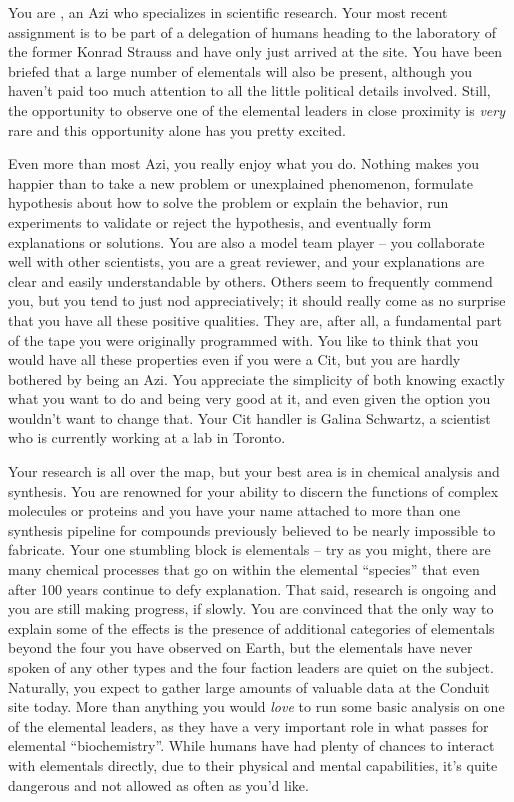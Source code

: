 \documentclass[char]{elementals}
\begin{document}
\name{\cScientist{}}

You are \cScientist{\intro}, an Azi who specializes in scientific research. Your most recent assignment is to be part of a delegation of humans heading to the laboratory of the former Konrad Strauss and have only just arrived at the site. You have been briefed that a large number of elementals will also be present, although you haven't paid too much attention to all the little political details involved. Still, the opportunity to observe one of the elemental leaders in close proximity is \emph{very} rare and this opportunity alone has you pretty excited.

Even more than most Azi, you really enjoy what you do. Nothing makes you happier than to take a new problem or unexplained phenomenon, formulate hypothesis about how to solve the problem or explain the behavior, run experiments to validate or reject the hypothesis, and eventually form explanations or solutions. You are also a model team player -- you collaborate well with other scientists, you are a great reviewer, and your explanations are clear and easily understandable by others. Others seem to frequently commend you, but you tend to just nod appreciatively; it should really come as no surprise that you have all these positive qualities. They are, after all, a fundamental part of the tape you were originally programmed with. You like to think that you would have all these properties even if you were a Cit, but you are hardly bothered by being an Azi. You appreciate the simplicity of both knowing exactly what you want to do and being very good at it, and even given the option you wouldn't want to change that. Your Cit handler is Galina Schwartz, a scientist who is currently working at a lab in Toronto.

Your research is all over the map, but your best area is in chemical analysis and synthesis. You are renowned for your ability to discern the functions of complex molecules or proteins and you have your name attached to more than one synthesis pipeline for compounds previously believed to be nearly impossible to fabricate. Your one stumbling block is elementals -- try as you might, there are many chemical processes that go on within the elemental ``species'' that even after 100 years continue to defy explanation. That said, research is ongoing and you are still making progress, if slowly. You are convinced that the only way to explain some of the effects is the presence of additional categories of elementals beyond the four you have observed on Earth, but the elementals have never spoken of any other types and the four faction leaders are quiet on the subject. Naturally, you expect to gather large amounts of valuable data at the Conduit site today. More than anything you would \emph{love} to run some basic analysis on one of the elemental leaders, as they have a very important role in what passes for elemental ``biochemistry''. While humans have had plenty of chances to interact with elementals directly, due to their physical and mental capabilities, it's quite dangerous and not allowed as often as you'd like.
\end{document}
